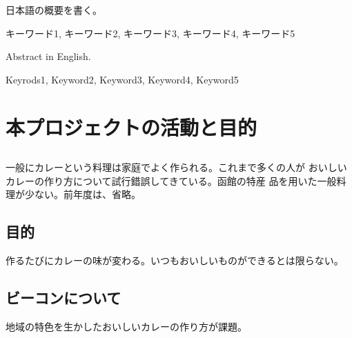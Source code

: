 \documentclass[openany,11pt,papersize]{jsbook}
\begin{document}
%
\maketitle

\frontmatter

\begin{jabstract} 日本語の概要を書く。
\begin{jkeyword}
キーワード1, キーワード2, キーワード3, キーワード4, キーワード5
\end{jkeyword}
\end{jabstract}

\begin{eabstract} Abstract in English. 
\begin{ekeyword}
Keyrods1, Keyword2, Keyword3, Keyword4, Keyword5
\end{ekeyword}
\end{eabstract}

\tableofcontents%


\mainmatter%

\chapter{本プロジェクトの活動と目的}


\section{}

一般にカレーという料理は家庭でよく作られる。これまで多くの人が
おいしいカレーの作り方について試行錯誤してきている。函館の特産
品を用いた一般料理が少ない。前年度は、省略。

\section{目的}
作るたびにカレーの味が変わる。いつもおいしいものができるとは限らない。

\section{ビーコンについて}\label{sec:gaiyou}
地域の特色を生かしたおいしいカレーの作り方が課題。
\end{document}
